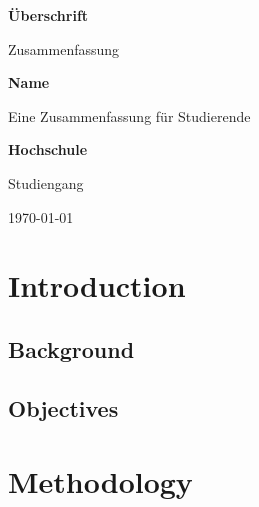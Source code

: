 \documentclass[12pt, a4paper]{article}
\begin{document}
\begin{titlepage}
\begin{titlepage}
    \begin{center}
        \vspace*{1cm}

        \textbf{\LARGE Überschrift}

        \vspace{0.5cm}
        Zusammenfassung

        \vspace{1.5cm}
        \textbf{\Large Name}

        \vfill

        Eine Zusammenfassung für Studierende

        \vspace{0.8cm}
        \textbf{\large Hochschule}

        \vspace{0.5cm}
        Studiengang

        \vspace{0.5cm}
        \today

    \end{center}
\end{titlepage}
\end{titlepage}

\begin{abstract}
\end{abstract}

\tableofcontents
\newpage

\section{Introduction}

\subsection{Background}

\subsection{Objectives}

\section{Methodology}
\end{document}
